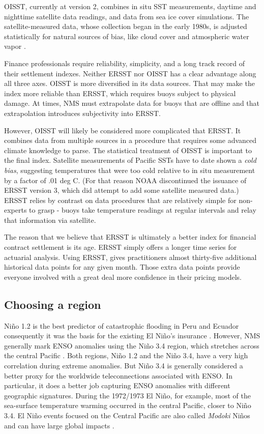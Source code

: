 \documentclass[authoryear]{article}
\begin{document}
OISST, currently at version 2, combines in situ SST measurements, daytime and nighttime satellite data readings, and data from sea ice cover simulations. The satellite-measured data, whose collection began in the early 1980s, is adjusted statistically for natural sources of bias, like cloud cover and atmospheric water vapor\cite{reynolds2002improved} \cite{reynolds1994improved} \cite{reynolds1993improved} \cite{reynolds1988real}. 

Finance professionals require reliability, simplicity, and a long track record of their settlement indexes. Neither ERSST nor OISST has a clear advantage along all three axes. OISST is more diversified in its data sources. That may make the index more reliable than ERSST, which requires buoys subject to physical damage. At times, NMS must extrapolate data for buoys that are offline and that extrapolation introduces subjectivity into ERSST.

However, OISST will likely be considered more complicated that ERSST. It combines data from multiple sources in a procedure that requires some advanced climate knowledge to parse. The statistical treatment of OISST is important to the final index. Satellite measurements of Pacific SSTs have to date shown a \emph{cold bias}, suggesting temperatures that were too cold relative to in situ measurement by a factor of .01 deg C. (For that reason NOAA discontinued the issuance of ERSST version 3, which did attempt to add some satellite measured data.) ERSST relies by contrast on data procedures that are relatively simple for non-experts to grasp - buoys take temperature readings at regular intervals and relay that information via satellite.

The reason that we believe that ERSST is ultimately a better index for financial contract settlement is its age. ERSST simply offers a longer time series for actuarial analysis. Using ERSST, gives practitioners almost thirty-five additional historical data points for any given month. Those extra data points provide everyone involved with a great deal more confidence in their pricing models. 

\subsection{Choosing a region}
Ni\~no 1.2 is the best predictor of catastrophic flooding in Peru and Ecuador consequently it was the basis for the existing El Ni\~no's insurance \cite{khalil2007nino}. However, NMS generally mark ENSO anomalies using the Ni\~no 3.4 region, which stretches across the central Pacific \cite{barnston1997documentation}. Both regions, Ni\~no 1.2 and the Ni\~no 3.4, have a very high correlation during extreme anomalies. But Ni\~no 3.4 is generally considered a better proxy for the worldwide teleconnections associated with ENSO. In particular, it does a better job capturing ENSO anomalies with different geographic signatures. During the 1972/1973 El Ni\~no, for example, most of the sea-surface temperature warming occurred in the central Pacific, closer to Ni\~no 3.4. El Ni\~no events focused on the Central Pacific are also called \emph{Modoki} Ni\~nos and can have large global impacts \cite{ashok2007Nino}.
\end{document}
